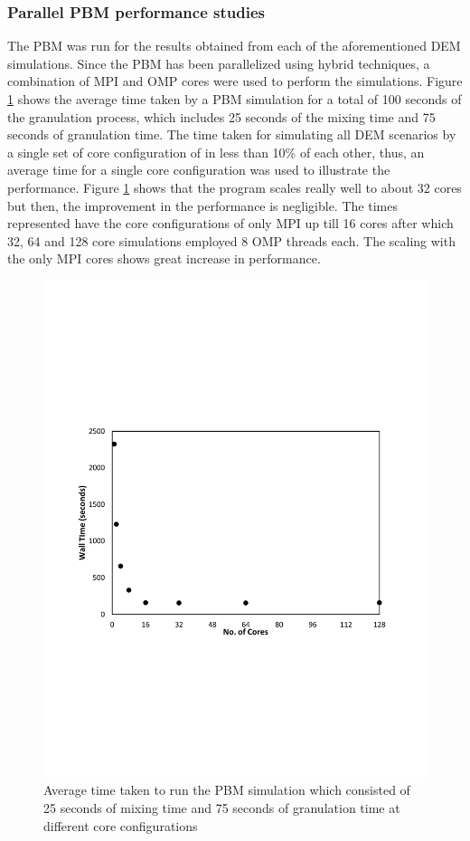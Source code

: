 \documentclass[preprint,11pt,authoryear]{elsarticle}
\begin{document}
\subsubsection{Parallel PBM performance studies}
 The PBM was run for the results obtained from each of the aforementioned DEM simulations. 
Since the PBM has been parallelized using hybrid techniques, a combination of MPI and OMP cores 
were used to perform the simulations. Figure \ref{fig:rslts_PBM_timing_studies} shows the average time 
taken by a PBM simulation for a total of 100 seconds of the granulation process, which includes 25 
seconds of the mixing time and 75 seconds of granulation time. The time taken for simulating all DEM 
scenarios by a single set of core configuration of in less than 10\% of each other, thus, an  average 
time for a single core configuration was used to illustrate the performance. Figure 
\ref{fig:rslts_PBM_timing_studies} shows that the program scales really well to about 32 cores but then, 
the improvement in the performance is negligible. The times represented have the core configurations 
of only MPI up till 16 cores after which 32, 64 and 128 core simulations employed 8 OMP threads 
each. The scaling with the only MPI cores shows great increase in performance. \\
\begin{figure}[H]
\centering
\includegraphics[scale=0.7]{rslts_PBM_Time_analysis.pdf}
\caption{Average time taken to run the PBM simulation which consisted of 25 seconds of mixing time 
and 75 seconds of granulation time at different core configurations}
\label{fig:rslts_PBM_timing_studies}
\end{figure}
\end{document}
